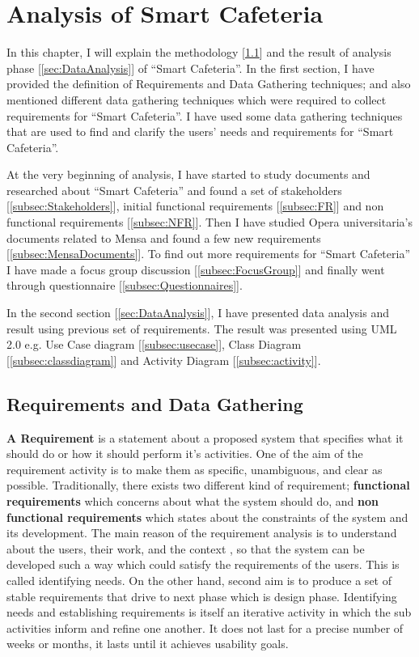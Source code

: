 \chapter{Analysis of Smart Cafeteria}
\label{chap:AnalysisofSmartCafeteria}

In this chapter, I will explain the methodology
[\ref{sec:RequirementDataGathering}] and the result of analysis phase
[\ref{sec:DataAnalysis}] of ``Smart Cafeteria''. In the first section, I have
provided the definition of Requirements and Data Gathering techniques; and also
mentioned different data gathering techniques which were required to collect
requirements for ``Smart Cafeteria''. I have used some data gathering techniques
that are used to find and clarify the users' needs and requirements for ``Smart
Cafeteria''.


At the very beginning of analysis, I have started to study documents and
researched about ``Smart Cafeteria'' and found a set of stakeholders
[\ref{subsec:Stakeholders}], initial functional requirements [\ref{subsec:FR}]
and non functional requirements [\ref{subsec:NFR}].
Then I have studied Opera universitaria's documents related to Mensa and found a
few new requirements [\ref{subsec:MensaDocuments}]. To find out more
requirements for ``Smart Cafeteria'' I have made a focus group discussion
[\ref{subsec:FocusGroup}] and finally went through questionnaire
[\ref{subsec:Questionnaires}].


In the second section [\ref{sec:DataAnalysis}], I have presented data analysis and
result using previous set of requirements. The result was presented using UML
2.0 e.g. Use Case diagram [\ref{subsec:usecase}], Class Diagram
[\ref{subsec:classdiagram}] and Activity Diagram [\ref{subsec:activity}].


\section{Requirements and Data Gathering}
\label{sec:RequirementDataGathering}
\textbf{A Requirement} \cite{preece2002interaction} is a statement about a
proposed system that specifies what it should do or how it should perform it's
activities. One of the aim of the requirement activity is to make them as
specific, unambiguous, and clear as possible. Traditionally, there exists two
different kind of requirement; \textbf{functional requirements} which concerns
about what the system should do, and \textbf{non functional requirements} which
states about the constraints of the system and its development. The main reason
of the requirement analysis is to understand about the users, their work, and
the context , so that the system can be developed such a way which could satisfy
the requirements of the users. This is called identifying needs. On the other
hand, second aim is to produce a set of stable requirements that drive to next
phase which is design phase.
Identifying needs and establishing requirements is itself an iterative activity
in which the sub activities inform and refine one another. It does not last for
a precise number of weeks or months, it lasts until it achieves usability goals.

